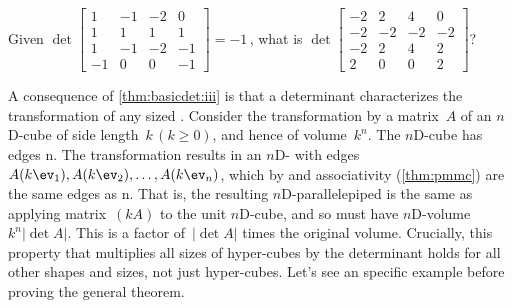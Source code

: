 \begin{activity}\sloppy
Given
\(\det\begin{bmatrix} 1&-1&-2&0
\\1&1&1&1
\\1&-1&-2&-1
\\-1&0&0&-1 \end{bmatrix}=-1\)\,,
what is 
\(\det\begin{bmatrix} -2&2&4&0
\\-2&-2&-2&-2
\\-2&2&4&2
\\2&0&0&2 \end{bmatrix}\)?
\end{activity}


A consequence of \autoref{thm:basicdet:iii} is that a determinant characterizes the transformation of any sized . 
Consider the transformation by a matrix~\(A\) of an $n$D-cube of side length~\(k\,(k\geq0)\), and hence of volume~\(k^n\).
The $n$D-cube has edges n.
The transformation results in an $n$D- with edges \(A(k\ev_1),A(k\ev_2),\ldots,A(k\ev_n)\), which by  and associativity (\autoref{thm:pmmc}) are the same edges as n.
That is, the resulting $n$D-parallelepiped is the same as applying matrix~\((kA)\) to the unit $n$D-cube, and so must have $n$D-volume~\(k^n|\det A|\).
This is a factor of~\(|\det A|\) times the original volume.
Crucially, this property that  multiplies all sizes of hyper-cubes by the determinant holds for all other shapes and sizes, not just hyper-cubes.
Let's see an specific example before proving the general theorem.

